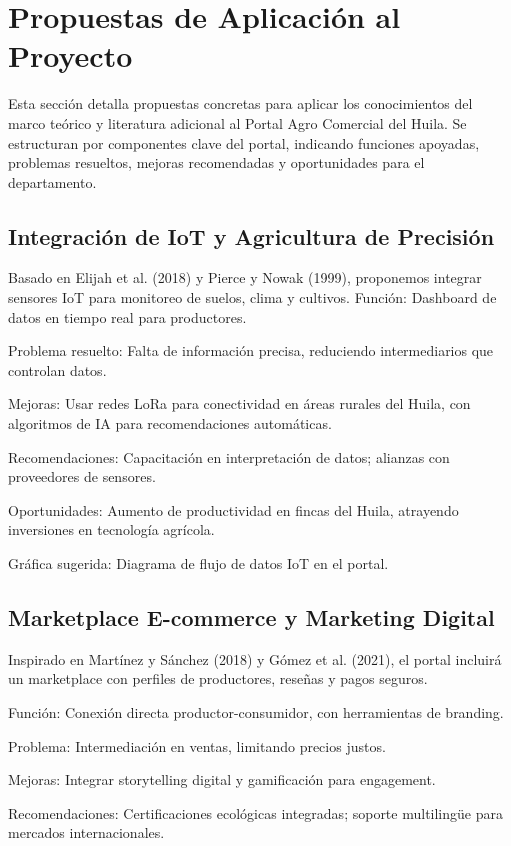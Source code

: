 \section{Propuestas de Aplicación al Proyecto}

Esta sección detalla propuestas concretas para aplicar los conocimientos del marco teórico y literatura adicional al Portal Agro Comercial del Huila. Se estructuran por componentes clave del portal, indicando funciones apoyadas, problemas resueltos, mejoras recomendadas y oportunidades para el departamento.

\subsection{Integración de IoT y Agricultura de Precisión}

Basado en Elijah et al. (2018) y Pierce y Nowak (1999), proponemos integrar sensores IoT para monitoreo de suelos, clima y cultivos. Función: Dashboard de datos en tiempo real para productores.

Problema resuelto: Falta de información precisa, reduciendo intermediarios que controlan datos.

Mejoras: Usar redes LoRa para conectividad en áreas rurales del Huila, con algoritmos de IA para recomendaciones automáticas.

Recomendaciones: Capacitación en interpretación de datos; alianzas con proveedores de sensores.

Oportunidades: Aumento de productividad en fincas del Huila, atrayendo inversiones en tecnología agrícola.

Gráfica sugerida: Diagrama de flujo de datos IoT en el portal.

\subsection{Marketplace E-commerce y Marketing Digital}

Inspirado en Martínez y Sánchez (2018) y Gómez et al. (2021), el portal incluirá un marketplace con perfiles de productores, reseñas y pagos seguros.

Función: Conexión directa productor-consumidor, con herramientas de branding.

Problema: Intermediación en ventas, limitando precios justos.

Mejoras: Integrar storytelling digital y gamificación para engagement.

Recomendaciones: Certificaciones ecológicas integradas; soporte multilingüe para mercados internacionales.

